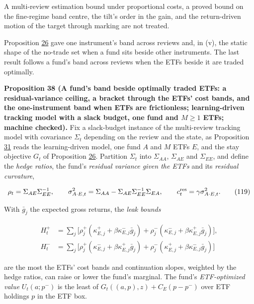 \documentclass[11pt]{article}
\begin{document}
A multi-review estimation bound under proportional costs, a proved
bound on the fine-regime band centre, the tilt's order in the gain,
and the return-driven motion of the target through marking are not
treated.

Proposition \hyperref[res:Proposition-26]{26} gave one instrument's band across reviews and, in
(v), the static shape of the no-trade set when a fund sits beside
other instruments. The last result follows a fund's band across
reviews when the ETFs beside it are traded optimally.

\label{res:Proposition-38}
\textbf{Proposition 38 (A fund's band beside optimally traded ETFs: a residual-variance ceiling, a bracket through the ETFs' cost bands, and the one-instrument band when ETFs are frictionless; learning-driven tracking model with a slack budget, one fund and \(M\geq1\) ETFs; machine checked).}
Fix a slack-budget instance of the multi-review tracking model with
covariance \(\Sigma_t\) depending on the review and the state, as
Proposition \hyperref[res:Proposition-31]{31} reads the learning-driven model, one fund \(A\) and \(M\)
ETFs \(E\), and the stay objective \(G_t\) of Proposition \hyperref[res:Proposition-26]{26}. Partition \(\Sigma_t\)
into \(\Sigma_{AA}\), \(\Sigma_{AE}\) and \(\Sigma_{EE}\), and define the \emph{hedge ratios}, the
fund's \emph{residual variance given the ETFs} and its \emph{residual curvature},

\begin{equation*}
\rho_t=\Sigma_{AE}\Sigma_{EE}^{-1},\qquad
\sigma^2_{A\cdot E,t}=\Sigma_{AA}-\Sigma_{AE}\Sigma_{EE}^{-1}\Sigma_{EA},\qquad
c^{\rm res}_t=\gamma\sigma^2_{A\cdot E,t}.\tag{119}\label{eq:119}
\end{equation*}

With \(\bar g_j\) the expected gross returns, the \emph{leak bounds}

\begin{equation*}
\begin{aligned}
H^+_t&=\textstyle\sum_j\bigl[\rho_j^+(\kappa^+_{E,j}+\beta\kappa^-_{E,j}\bar g_j)+\rho_j^-(\kappa^-_{E,j}+\beta\kappa^+_{E,j}\bar g_j)\bigr],\\
H^-_t&=\textstyle\sum_j\bigl[\rho_j^+(\kappa^-_{E,j}+\beta\kappa^+_{E,j}\bar g_j)+\rho_j^-(\kappa^+_{E,j}+\beta\kappa^-_{E,j}\bar g_j)\bigr]
\end{aligned}\tag{120}\label{eq:120}
\end{equation*}

are the most the ETFs' cost bands and continuation slopes, weighted by
the hedge ratios, can raise or lower the fund's marginal. The fund's
\emph{ETF-optimized value} \(U_t(a;p^-)\) is the least of \(G_t((a,p),z)+C_E(p-p^-)\)
over ETF holdings \(p\) in the ETF box.
\end{document}
